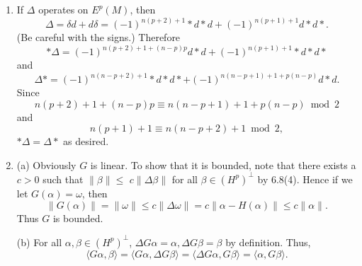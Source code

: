 \begin{enumerate}
\item If $\Delta$ operates on $E^{p}(M)$, then
\[\Delta=\delta d+d \delta=(-1)^{n(p+2)+1} * d * d+(-1)^{n(p+1)+1} d * d *.\]
(Be careful with the signs.) Therefore
\[* \Delta=(-1)^{n(p+2)+1+(n-p) p} d * d+(-1)^{n(p+1)+1} * d * d *\]
and \[\Delta *=(-1)^{n(n-p+2)+1} * d * d *+(-1)^{n(n-p+1)+1+p(n-p)} d * d.\]
Since \[n(p+2)+1+(n-p) p \equiv n(n-p+1)+1+p(n-p) \bmod 2\] and
\[n(p+1)+1 \equiv n(n-p+2)+1 \bmod 2,\]
$* \Delta=\Delta *$ as desired.
\item (a) Obviously $G$ is linear. To show that it is bounded, 
note that there exists a $c>0$ such that $\|\beta\| \leq$ $c\|\Delta \beta\|$ for all $\beta \in(H^{p})^{\perp}$ by 6.8(4). 
Hence if we let $G(\alpha)=\omega$, then
\[\|G(\alpha)\|=\|\omega\| \leq c\|\Delta \omega\|
=c\|\alpha-H(\alpha)\| \leq c\|\alpha\|.\]
Thus $G$ is bounded.

(b) For all $\alpha, \beta \in (H^{p})^{\perp}$, $\Delta G \alpha=\alpha, \Delta G \beta=\beta$ by definition. Thus,
\[\langle G \alpha, \beta\rangle=\langle G \alpha, \Delta G \beta\rangle
=\langle\Delta G \alpha, G \beta\rangle=\langle\alpha, G \beta\rangle.\]


\end{enumerate}
